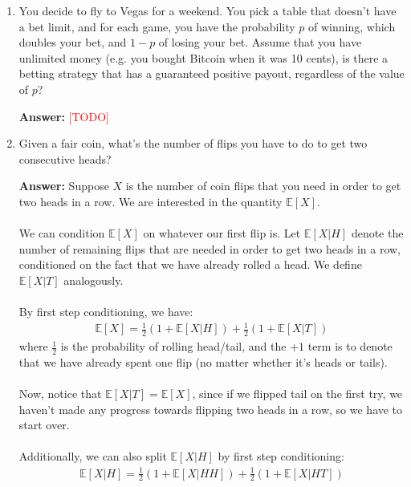 \documentclass{article}
\newenvironment{QandA}{\begin{enumerate}[label=\arabic*.]}{\end{enumerate}}
\newenvironment{answer}{\par\normalfont \textbf{Answer:}}{}
\newcommand{\Exp}[1]{\mathbb{E}\left[ #1 \right]}
\newcommand{\g}{\vert}
\newcommand{\todo}{\textcolor{red}{[TODO]}}
\begin{document}
\begin{QandA}
\begin{answer}
        (Source: \href{https://en.wikipedia.org/wiki/Birthday_problem}{Wikipedia})
    \end{answer}

    \item You decide to fly to Vegas for a weekend. You pick a table that doesn't have a bet limit, and for each game, you have the probability $p$ of winning, which doubles your bet, and $1-p$ of losing your bet. Assume that you have unlimited money (e.g. you bought Bitcoin when it was 10 cents), is there a betting strategy that has a guaranteed positive payout, regardless of the value of $p$?
    \begin{answer}
        \todo
    \end{answer}
    
    \item Given a fair coin, what’s the number of flips you have to do to get two consecutive heads?
    \begin{answer}
        Suppose $X$ is the number of coin flips that you need in order to get two heads in a row. We are interested in the quantity $\Exp{X}$. \\\\
        We can condition $\Exp{X}$ on whatever our first flip is. Let $\Exp{X \g H}$ denote the number of remaining flips that are needed in order to get two heads in a row, conditioned on the fact that we have already rolled a head. We define $\Exp{X \g T}$ analogously. \\\\
        By first step conditioning, we have:
        \begin{align*}
            \Exp{X} = \frac{1}{2}\left( 1 + \Exp{X \g H} \right) + \frac{1}{2}\left( 1 + \Exp{X \g T} \right)
        \end{align*}
        where $\frac{1}{2}$ is the probability of rolling head/tail, and the $+ 1$ term is to denote that we have already spent one flip (no matter whether it's heads or tails). \\\\
        Now, notice that $\Exp{X \g T} = \Exp{X}$, since if we flipped tail on the first try, we haven't made any progress towards flipping two heads in a row, so we have to start over. \\\\
        Additionally, we can also split $\Exp{X \g H}$ by first step conditioning:
        \begin{align*}
            \Exp{X \g H} = \frac{1}{2} \left(1 + \Exp{X \g HH} \right) + \frac{1}{2} \left(1 + \Exp{X \g HT} \right)

\end{align*}
\end{answer}
\end{QandA}
\end{document}
